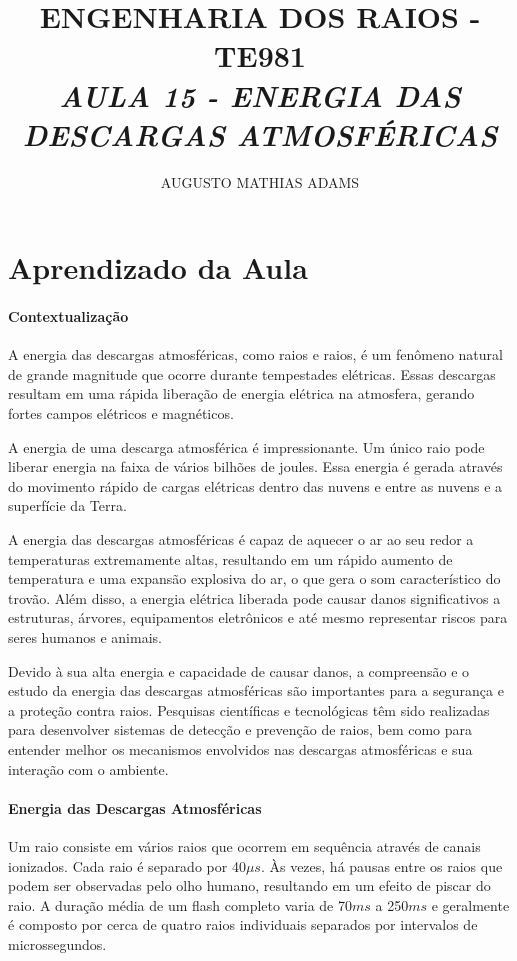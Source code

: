 \documentclass[a4paper, 12pt, onecolumn,singlespacing]{article}
\title{\normalsize{ENGENHARIA DOS RAIOS - TE981}\\ \huge{\textbf\textit{{AULA 15 - ENERGIA DAS DESCARGAS ATMOSFÉRICAS}}\\}}
\author{\small{AUGUSTO MATHIAS ADAMS}}
\begin{document}
	
	\maketitle
	
	\section{Aprendizado da Aula}
	
	\paragraph{Contextualização}
	
	A energia das descargas atmosféricas, como raios e raios, é um fenômeno natural de grande magnitude que ocorre durante tempestades elétricas. Essas descargas resultam em uma rápida liberação de energia elétrica na atmosfera, gerando fortes campos elétricos e magnéticos.
	
	A energia de uma descarga atmosférica é impressionante. Um único raio pode liberar energia na faixa de vários bilhões de joules. Essa energia é gerada através do movimento rápido de cargas elétricas dentro das nuvens e entre as nuvens e a superfície da Terra.
	
	A energia das descargas atmosféricas é capaz de aquecer o ar ao seu redor a temperaturas extremamente altas, resultando em um rápido aumento de temperatura e uma expansão explosiva do ar, o que gera o som característico do trovão. Além disso, a energia elétrica liberada pode causar danos significativos a estruturas, árvores, equipamentos eletrônicos e até mesmo representar riscos para seres humanos e animais.
	
	Devido à sua alta energia e capacidade de causar danos, a compreensão e o estudo da energia das descargas atmosféricas são importantes para a segurança e a proteção contra raios. Pesquisas científicas e tecnológicas têm sido realizadas para desenvolver sistemas de detecção e prevenção de raios, bem como para entender melhor os mecanismos envolvidos nas descargas atmosféricas e sua interação com o ambiente.
	
	\paragraph{Energia das Descargas Atmosféricas}
	
	Um raio consiste em vários raios que ocorrem em sequência através de canais ionizados. Cada raio é separado por 40$\mu s$. Às vezes, há pausas entre os raios que podem ser observadas pelo olho humano, resultando em um efeito de piscar do raio. A duração média de um flash completo varia de 70$ms$ a 250$ms$ e geralmente é composto por cerca de quatro raios individuais separados por intervalos de microssegundos.
	
\end{document}
